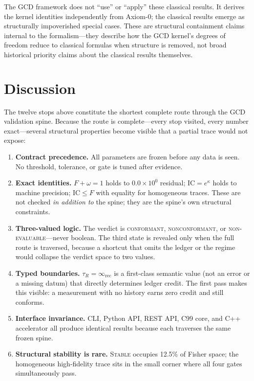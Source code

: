 \documentclass[
  aps,
  prd,
  twocolumn,
  superscriptaddress,
  nofootinbib,
  floatfix
]{revtex4-2}
\newcommand{\tR}{\tau_{\!R}}
\newcommand{\IR}{\infty_{\mathrm{rec}}}
\newcommand{\regime}[1]{\textrm{\upshape\scshape#1}}
\newcommand{\conform}{\regime{conformant}}
\newcommand{\nonconform}{\regime{nonconformant}}
\newcommand{\neval}{\regime{non-evaluable}}
\newcommand{\IC}{\mathrm{IC}}
\begin{document}
The GCD framework does not ``use'' or ``apply'' these classical
results.  It derives the kernel identities independently from
Axiom-0; the classical results emerge as structurally impoverished
special cases.  These are structural containment claims internal to
the formalism---they describe how the GCD kernel's degrees of freedom
reduce to classical formulas when structure is removed, not broad
historical priority claims about the classical results themselves.

\section{Discussion}\label{sec:discussion}

The twelve stops above constitute the shortest complete route through
the GCD validation spine.  Because the route is complete---every stop
visited, every number exact---several structural properties become
visible that a partial trace would not expose:

\begin{enumerate}[leftmargin=*]
\item \textbf{Contract precedence.}  All parameters are frozen
  before any data is seen.  No threshold, tolerance, or gate is
  tuned after evidence.

\item \textbf{Exact identities.}  $F + \omega = 1$ holds to
  $0.0 \times 10^0$ residual; $\IC = e^\kappa$ holds to machine
  precision; $\IC \leq F$ with equality for homogeneous traces.
  These are not checked \emph{in addition to} the spine; they are
  the spine's own structural constraints.

\item \textbf{Three-valued logic.}  The verdict is \conform{},
  \nonconform{}, or \neval{}---never boolean.  The third state
  is revealed only when the full route is traversed, because a
  shortcut that omits the ledger or the regime would collapse the
  verdict space to two values.

\item \textbf{Typed boundaries.}  $\tR = \IR$ is a first-class
  semantic value (not an error or a missing datum) that directly
  determines ledger credit.  The first pass makes this visible:
  a measurement with no history earns zero credit and still
  conforms.

\item \textbf{Interface invariance.}  CLI, Python API, REST API,
  C99 core, and C++ accelerator all produce identical results
  because each traverses the same frozen spine.

\item \textbf{Structural stability is rare.}
  \regime{Stable} occupies 12.5\% of Fisher space; the homogeneous
  high-fidelity trace sits in the small corner where all four gates
  simultaneously pass.
\end{enumerate}
\end{document}

